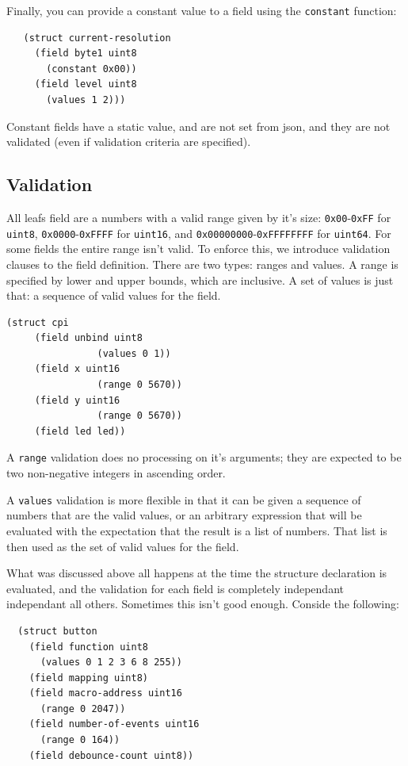\documentclass[12pt]{article}
\begin{document}
Finally, you can provide a constant value to a field using the
\verb|constant| function:

\begin{verbatim}
   (struct current-resolution
     (field byte1 uint8
       (constant 0x00))
     (field level uint8
       (values 1 2)))
\end{verbatim}

Constant fields have a static value, and are not set from json, and
they are not validated (even if validation criteria are specified).

\subsection{Validation}

All leafs field are a numbers with a valid range given by it's size:
\verb|0x00|-\verb|0xFF| for \verb|uint8|, \verb|0x0000|-\verb|0xFFFF| for \verb|uint16|, and
\verb|0x00000000|-\verb|0xFFFFFFFF| for \verb|uint64|. For some fields the entire range
isn't valid. To enforce this, we introduce validation clauses to the
field definition. There are two types: ranges and values. A range is
specified by lower and upper bounds, which are inclusive. A set of
values is just that: a sequence of valid values for the field. 

\begin{verbatim}
(struct cpi
     (field unbind uint8
                (values 0 1))
     (field x uint16
                (range 0 5670))
     (field y uint16
                (range 0 5670))
     (field led led))
\end{verbatim}

A \verb|range| validation does no processing on it's arguments; they
are expected to be two non-negative integers in ascending order.

A \verb|values| validation is more flexible in that it can be given a
sequence of numbers that are the valid values, or an
arbitrary expression that will be evaluated with the expectation that
the result is a list of numbers. That list is then used as the set of
valid values for the field.

What was discussed above all happens at the time the structure
declaration is evaluated, and the validation for each field is
completely independant independant all others. Sometimes this isn't
good enough. Conside the following:


\begin{verbatim}
  (struct button
    (field function uint8
      (values 0 1 2 3 6 8 255))
    (field mapping uint8)
    (field macro-address uint16
      (range 0 2047))
    (field number-of-events uint16
      (range 0 164))
    (field debounce-count uint8))
\end{verbatim}
\end{document}
